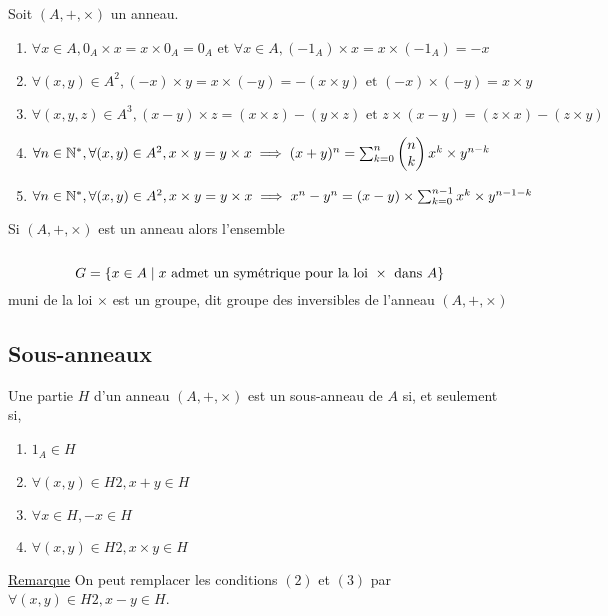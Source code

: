 \begin{defprop}
    Soit \((A, +, \times)\) un anneau.
    \begin{enumerate}
        \item \( \forall x \in A, 0_A \times x = x \times 0_A = 0_A \text{ et }\forall x \in A, (-1_A) \times x = x \times (-1_A) = -x\)
        \item \(\forall (x, y) \in A^2, (-x) \times y = x \times (-y) = -(x \times y) \text{ et } (-x) \times (-y) = x \times y\)
        \item \(\forall (x, y, z) \in A^3, (x - y) \times z = (x \times z) - (y \times z) \text{ et } z \times (x - y) = (z \times x) - (z \times y)\)
        \item \(\forall n \in \Ns, \forall (x, y) \in A^2, x \times y = y \times x \imp (x + y)^n = \sum_{k=0}^n \binom{k}{n}x^k \times y^{n-k} \)
        \item \(\forall n \in \Ns, \forall (x, y) \in A^2, x \times y = y \times x \imp x^n - y^n = (x - y) \times \sum^{n-1}_{k=0} x^k \times y^{n-1-k}\)
    \end{enumerate}
\end{defprop}

\begin{defprop}
    Si \((A, +, \times)\) est un anneau alors l’ensemble\\~\\
    \[G = \accol{x \in A \tq x \text{ admet un symétrique pour la loi }\times \text{ dans }A}\]
    muni de la loi \(\times\) est un groupe, dit groupe des inversibles de l’anneau \((A, +, \times)\)
\end{defprop}

\subsection{Sous-anneaux}
\begin{defprop}
    Une partie \(H\) d’un anneau \((A, +, \times)\) est un sous-anneau de \(A\) si, et seulement si,
    \begin{enumerate}
        \item \(1_A \in H\)
        \item \(\forall(x, y) \in H2, x + y \in H\)
        \item \(\forall x \in H, -x \in H\)
        \item \(\forall(x, y) \in H2, x × y \in H\)
    \end{enumerate}
    \underline{Remarque}
    On peut remplacer les conditions \((2)\) et \((3)\) par \(\forall(x, y) \in H2, x - y \in H\).
\end{defprop}

